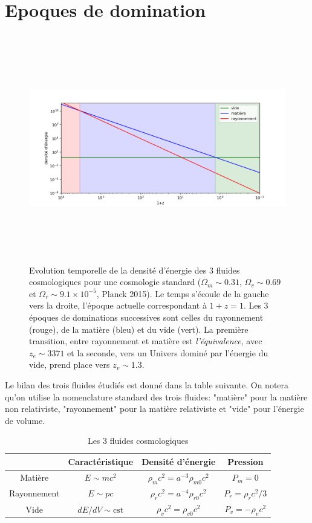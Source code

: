 \section{Epoques de domination}
\begin{figure}[htbp]
	\centering
		\includegraphics[height=10cm]{figs/era.png}
	\caption[Epoques de domination des fluides cosmiques]{Evolution temporelle de la densité d'énergie des 3 fluides cosmologiques pour une cosmologie standard ($\Omega_m \sim 0.31$, $\Omega_v \sim 0.69$ et $\Omega_r\sim 9.1\times 10^{-5}$, Planck 2015). Le temps s'écoule de la gauche vers la droite, l'époque actuelle correspondant à $1+z=1$. Les 3 époques de dominations successives sont celles du rayonnement (rouge), de la matière (bleu) et du vide (vert). La première transition, entre rayonnement et matière est \textit{ l'équivalence}, avec $z_e\sim 3371$ et la seconde, vers un Univers dominé par l'énergie du vide, prend place vers $z_v \sim 1.3$. }
	\label{f:era}
\end{figure}
Le bilan des trois fluides étudiés est donné dans la table suivante. On notera qu'on utilise la nomenclature standard des trois fluides: "matière" pour la matière non relativiste, "rayonnement" pour la matière relativiste et "vide" pour l'énergie de volume.
\begin{table}[h]
\begin{center}
\begin{tabular}{|c|c|c|c|}
\hline 
 & Caractéristique & Densité d'énergie & Pression \\ 
\hline 
Matière & $E\sim mc^2$ & $\rho_mc^2 =a^{-3}\rho_{m0}c^2$& $P_m=0$\\ 
\hline 
Rayonnement & $E\sim pc$ & $\rho_rc^2 =a^{-4}\rho_{r0}c^2$ & $P_r=\rho_rc^2/3$ \\ 
\hline 
Vide & $dE/dV\sim \mathrm{cst}$ & $\rho_vc^2 =\rho_{v0}c^2$ & $P_v=-\rho_vc^2$ \\ 
\hline 
\end{tabular} 
\end{center}
\caption{Les 3 fluides cosmologiques}
\end{table}

